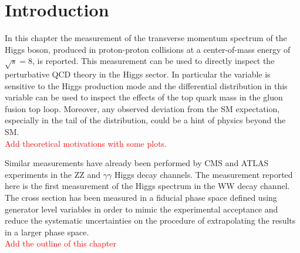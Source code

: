 \section{Introduction}
\label{sec:Introduction}

In this chapter the measurement of the transverse momentum spectrum of the Higgs boson, produced in proton-proton collisions at a center-of-mass energy of $\sqrt{s}=8$\TeV, is reported.
This measurement can be used to directly inspect the perturbative QCD theory in the Higgs sector.
In particular the \pth variable is sensitive to the Higgs production mode and the differential distribution in this variable can be used to inspect the effects of the top quark mass in the gluon fusion top loop. Moreover, any observed deviation from the SM expectation, especially in the tail of the \pth distribution, could be a hint of physics beyond the SM.\\
\textcolor{red}{Add theoretical motivations with some plots.}

Similar measurements have already been performed by CMS and ATLAS experiments in the ZZ and $\gamma\gamma$ Higgs decay channels.
The measurement reported here is the first measurement of the Higgs \pt spectrum in the WW decay channel.\\
The cross section has been measured in a fiducial phase space defined using generator level variables in order to mimic the experimental acceptance and reduce the systematic uncertainties on the procedure of extrapolating the results in a larger phase space.\\

\textcolor{red}{Add the outline of this chapter}




